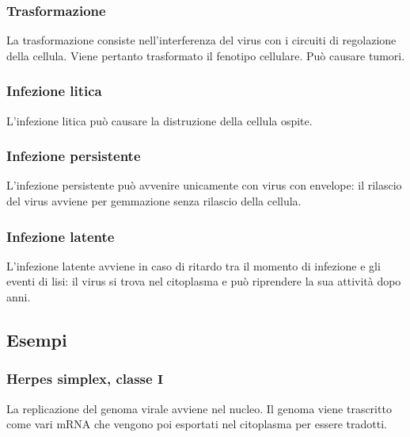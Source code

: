 		\subsubsection{Trasformazione}
		La trasformazione consiste nell'interferenza del virus con i circuiti di regolazione della cellula.
		Viene pertanto trasformato il fenotipo cellulare.
		Pu\`o causare tumori.

		\subsubsection{Infezione litica}
		L'infezione litica pu\`o causare la distruzione della cellula ospite.

		\subsubsection{Infezione persistente}
		L'infezione persistente pu\`o avvenire unicamente con virus con envelope: il rilascio del virus avviene per gemmazione senza rilascio della cellula.

		\subsubsection{Infezione latente}
		L'infezione latente avviene in caso di ritardo tra il momento di infezione e gli eventi di lisi: il virus si trova nel citoplasma e pu\`o riprendere la sua attivit\`a dopo anni.

	\subsection{Esempi}

		\subsubsection{Herpes simplex, classe $\mathbf{I}$}
		La replicazione del genoma virale avviene nel nucleo. 
		Il genoma viene trascritto come vari mRNA che vengono poi esportati nel citoplasma per essere tradotti. 

